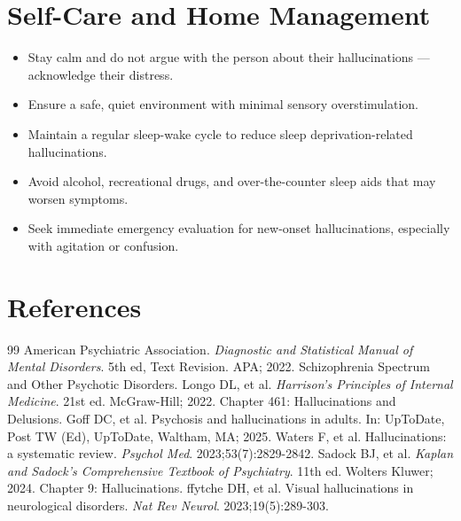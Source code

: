 \section*{Self-Care and Home Management}
\begin{itemize}
  \item Stay calm and do not argue with the person about their hallucinations — acknowledge their distress.
  \item Ensure a safe, quiet environment with minimal sensory overstimulation.
  \item Maintain a regular sleep-wake cycle to reduce sleep deprivation-related hallucinations.
  \item Avoid alcohol, recreational drugs, and over-the-counter sleep aids that may worsen symptoms.
  \item Seek immediate emergency evaluation for new-onset hallucinations, especially with agitation or confusion.
\end{itemize}

\section*{References}

\begin{thebibliography}{99}
 American Psychiatric Association. \emph{Diagnostic and Statistical Manual of Mental Disorders}. 5th ed, Text Revision. APA; 2022. Schizophrenia Spectrum and Other Psychotic Disorders.
 Longo DL, et al. \emph{Harrison's Principles of Internal Medicine}. 21st ed. McGraw-Hill; 2022. Chapter 461: Hallucinations and Delusions.
 Goff DC, et al. Psychosis and hallucinations in adults. In: UpToDate, Post TW (Ed), UpToDate, Waltham, MA; 2025.
 Waters F, et al. Hallucinations: a systematic review. \emph{Psychol Med}. 2023;53(7):2829-2842.
 Sadock BJ, et al. \emph{Kaplan and Sadock's Comprehensive Textbook of Psychiatry}. 11th ed. Wolters Kluwer; 2024. Chapter 9: Hallucinations.
 ffytche DH, et al. Visual hallucinations in neurological disorders. \emph{Nat Rev Neurol}. 2023;19(5):289-303.
\end{thebibliography}
